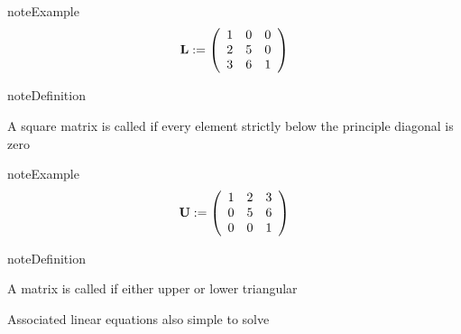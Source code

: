 \documentclass[letterpaper,10pt,english]{jupyterBook}
\begin{document}
\begin{sphinxadmonition}{note}{Example}
\begin{equation}\label{equation:05.linear_algebra:eq:ltute}
\begin{split}
%
{\bf L} :=
\left(
\begin{array}{ccc}
1 & 0 & 0 \\
2 & 5 & 0 \\
3 & 6 & 1
\end{array}
\right)
%
\end{split}
\end{equation}\end{sphinxadmonition}

\begin{sphinxadmonition}{note}{Definition}

\sphinxAtStartPar
A square matrix is called  if every element
strictly below the principle diagonal is zero
\end{sphinxadmonition}

\begin{sphinxadmonition}{note}{Example}
\begin{equation*}
\begin{split}
%
{\bf U} :=
\left(
\begin{array}{ccc}
1 & 2 & 3 \\
0 & 5 & 6 \\
0 & 0 & 1
\end{array}
\right)
%
\end{split}
\end{equation*}\end{sphinxadmonition}

\begin{sphinxadmonition}{note}{Definition}

\sphinxAtStartPar
A matrix is called  if either upper or lower triangular
\end{sphinxadmonition}

\sphinxAtStartPar
Associated linear equations also simple to solve
\end{document}
